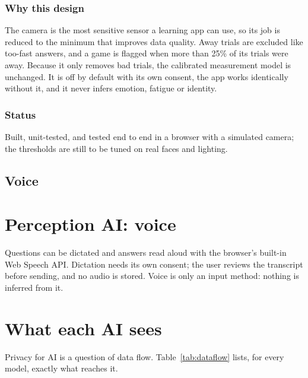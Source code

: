 \documentclass[11pt,a4paper]{article}
\begin{document}
\subsubsection{Why this design} The camera is the most sensitive sensor a learning app can use, so its job is reduced to the minimum that improves data quality. Away trials are excluded like too-fast answers, and a game is flagged when more than 25\% of its trials were away. Because it only removes bad trials, the calibrated measurement model is unchanged. It is off by default with its own consent, the app works identically without it, and it never infers emotion, fatigue or identity.

\subsubsection{Status} Built, unit-tested, and tested end to end in a browser with a simulated camera; the thresholds are still to be tuned on real faces and lighting.
\fi

\ifcamera\subsection*{Voice}\else\section{Perception AI: voice}\fi
Questions can be dictated and answers read aloud with the browser's built-in Web Speech API. Dictation needs its own consent; the user reviews the transcript before sending, and no audio is stored. Voice is only an input method: nothing is inferred from it.

\section{What each AI sees}
\label{sec:dataflow}

Privacy for AI is a question of data flow. Table~\ref{tab:dataflow} lists, for every model, exactly what reaches it.
\end{document}
